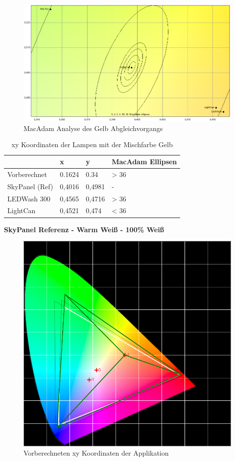 \documentclass[11pt]{scrartcl}
\begin{document}
\begin{figure}[H]
    \begin{center}
        \includegraphics[width=\textwidth]{images/macAdam/comparedYellow.png}
    \end{center}
    \caption{MacAdam Analyse des Gelb Abgleichvorgangs} \label{fig:macAdamYellow}
\end{figure}
\noindent
\begin{table}[H]
    \begin{tabularx}{\textwidth}{|X|X|X|X|}
        \hline           & x        & y        & MacAdam Ellipsen\\\hline
        Vorberechnet     & 0.1624   & 0.34     & > 36\\\hline
        SkyPanel (Ref)   & 0,4016   & 0,4981   & -\\\hline
        LEDWash 300      & 0,4565   & 0,4716   & > 36\\\hline
        LightCan         & 0,4521   & 0,474    & < 36\\\hline
    \end{tabularx}
    \caption{xy Koordinaten der Lampen mit der Mischfarbe Gelb}
\end{table}
\clearpage
\textbf{SkyPanel Referenz - Warm Weiß - 100\% Weiß}
\begin{figure}[H]
    \begin{center}
        \includegraphics[width=.8\textwidth]{images/app_mix_warmWhite_cie.png}
    \end{center}
    \caption{Vorberechneten xy Koordinaten der Applikation}
\end{figure}
\end{document}

